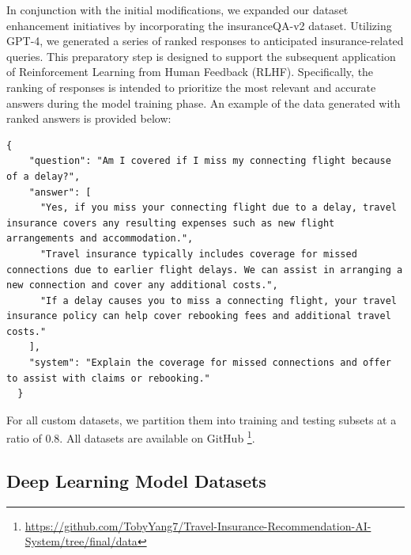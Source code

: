 \documentclass[conference]{IEEEtran}
\begin{document}
In conjunction with the initial modifications, we expanded our dataset enhancement initiatives by incorporating the insuranceQA-v2 dataset. Utilizing GPT-4, we generated a series of ranked responses to anticipated insurance-related queries. This preparatory step is designed to support the subsequent application of Reinforcement Learning from Human Feedback (RLHF). Specifically, the ranking of responses is intended to prioritize the most relevant and accurate answers during the model training phase. An example of the data generated with ranked answers is provided below:


\begin{Verbatim}[breaklines=true]
  {
    "question": "Am I covered if I miss my connecting flight because of a delay?",
    "answer": [
      "Yes, if you miss your connecting flight due to a delay, travel insurance covers any resulting expenses such as new flight arrangements and accommodation.",
      "Travel insurance typically includes coverage for missed connections due to earlier flight delays. We can assist in arranging a new connection and cover any additional costs.",
      "If a delay causes you to miss a connecting flight, your travel insurance policy can help cover rebooking fees and additional travel costs."
    ],
    "system": "Explain the coverage for missed connections and offer to assist with claims or rebooking."
  }
\end{Verbatim}



For all custom datasets, we partition them into training and testing subsets at a ratio of $0.8$. All datasets are available on GitHub \footnote{\url{https://github.com/TobyYang7/Travel-Insurance-Recommendation-AI-System/tree/final/data}}.

\subsection{Deep Learning Model Datasets}
\end{document}
